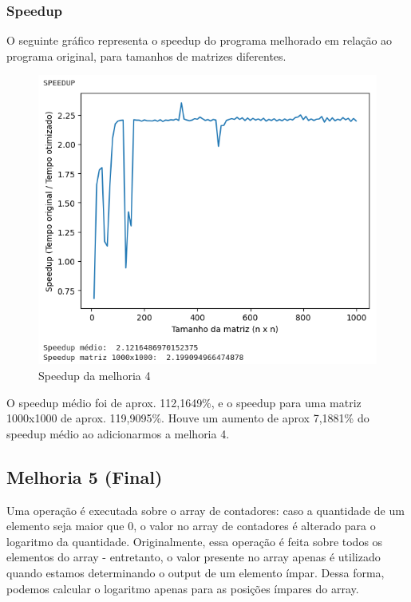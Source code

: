 \newpage

\subsubsection{\esp Speedup}
O seguinte gráfico representa o speedup do programa melhorado em relação ao programa original, para tamanhos de matrizes diferentes.

\begin{figure}[!ht]
	\centering	
	\caption[\hspace{0.1cm}Speedup da melhoria 4]{Speedup da melhoria 4}
	  \vspace{-0.4cm}
	\includegraphics[width=.8\textwidth]{figuras/speedup_melhoria4.png}
\end{figure}

O speedup médio foi de aprox. 112,1649\%, e o speedup para uma matriz 1000x1000 de aprox. 119,9095\%.  Houve um aumento de aprox 7,1881\% do speedup médio ao adicionarmos a melhoria 4. 

\subsection{\esp Melhoria 5 (Final)}
Uma operação é executada sobre o array de contadores: caso a quantidade de um elemento seja maior que 0, o valor no array de contadores é alterado para o logaritmo da quantidade. Originalmente, essa operação é feita sobre todos os elementos do array - entretanto, o valor presente no array apenas é utilizado quando estamos determinando o output de um elemento ímpar. Dessa forma, podemos calcular o logaritmo apenas para as posições ímpares do array. 

